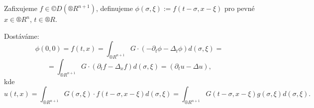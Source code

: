 \documentclass[12pt]{article}					%
\begin{document}
\begin{dusledek}
	Zafixujeme $f \in ©D(®R^{n+1})$, definujeme $\phi(\sigma, \xi) := f(t - \sigma, x - \xi)$ pro pevné $x \in ®R^n$, $t \in ®R$.

	Dostáváme:
	$$ \phi(0, 0) = f(t, x) = \int_{®R^{n+1}} G·(-\partial_t \phi - \Delta_t \phi) d(\sigma, \xi) = $$
	$$ = \int_{®R^{n+1}} G·(\partial_t f - \Delta_x f) d(\sigma, \xi) = (\partial_t u - \Delta u), $$
	kde
	$$ u(t, x) = \int_{®R^{n+1}} G(\sigma, \xi)·f(t - \sigma, x - \xi) d(\sigma, \xi) = \int_{®R^{n+1}} G(t - \sigma, x - \xi)g(\sigma, \xi)d(\sigma, \xi). $$
\end{dusledek}
\end{document}
